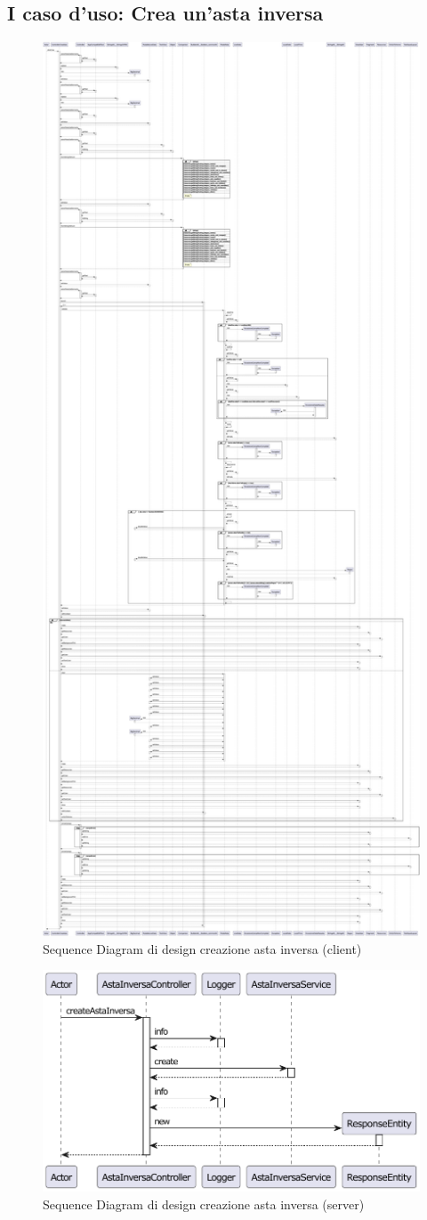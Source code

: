         \subsection{I caso d'uso: Crea un’asta inversa}
            \begin{figure}[htbp!]
                \centering
                    \includegraphics[width=0.47\linewidth]{Immagini/Diagrammi/Sequence Diagram/Design/Client Sequence Design/ClientSequenceCreaAstaDesign.pdf}
                \caption{Sequence Diagram di design creazione asta inversa (client)}
                \label{fig:Sequence Diagram di design creazione asta inversa (client)}
            \end{figure}

            \begin{figure}[htbp!]
                \centering
                    \includegraphics[width=1\linewidth]{Immagini/Diagrammi/Sequence Diagram/Design/Server Sequence Design/ServerSequenceCreaAstaDesign.pdf}
                \caption{Sequence Diagram di design creazione asta inversa (server)}
                \label{fig:Sequence Diagram di design creazione asta inversa (server)}
            \end{figure}

